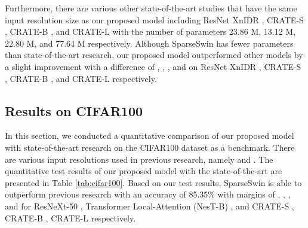 \documentclass[runningheads]{llncs}
\begin{document}
Furthermore, there are various other state-of-the-art studies that have the same input resolution size as our proposed model including ResNet XnIDR \cite{sun2021xnodr}, CRATE-S \cite{yu2023white}, CRATE-B \cite{yu2023white}, and CRATE-L \cite{yu2023white} with the number of parameters 23.86 M, 13.12 M, 22.80 M, and 77.64 M respectively. Although SparseSwin has fewer parameters than state-of-the-art research, our proposed model outperformed other models by a slight improvement with a difference of , , , and  on ResNet XnIDR \cite{sun2021xnodr}, CRATE-S \cite{yu2023white}, CRATE-B \cite{yu2023white}, and CRATE-L \cite{yu2023white} respectively. 

\begin{table}[tp]
\extracolsep{\fill}
\def\arraystretch{1.25}\centering
\large
\caption{Quantitative Comparison on CIFAR10}
\label{tab:cifar10}
\end{table}

\subsection{Results on CIFAR100}
\label{sec:cifar100}
In this section, we conducted a quantitative comparison of our proposed model with state-of-the-art research on the CIFAR100 dataset as a benchmark. There are various input resolutions used in previous research, namely  and . The quantitative test results of our proposed model with the state-of-the-art are presented in Table \ref{tab:cifar100}. Based on our test results, SparseSwin is able to outperform previous research with an accuracy of 85.35\% with margins of , , ,  and  for ResNeXt-50 \cite{DBLP:journals/corr/XieGDTH16} , Transformer Local-Attention (NesT-B) \cite{zhang2022nested}, and CRATE-S \cite{yu2023white}, CRATE-B \cite{yu2023white}, CRATE-L \cite{yu2023white} respectively.
\end{document}
